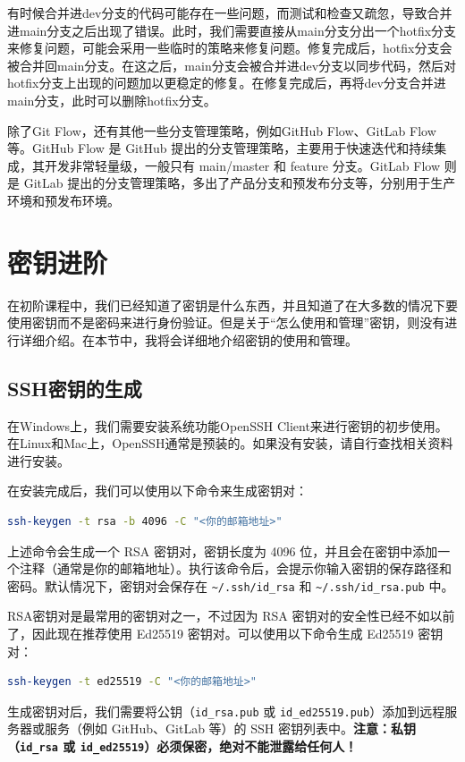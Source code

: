 \documentclass[../main.tex]{subfiles}
\begin{document}
有时候合并进dev分支的代码可能存在一些问题，而测试和检查又疏忽，导致合并进main分支之后出现了错误。此时，我们需要直接从main分支分出一个hotfix分支来修复问题，可能会采用一些临时的策略来修复问题。修复完成后，hotfix分支会被合并回main分支。在这之后，main分支会被合并进dev分支以同步代码，然后对hotfix分支上出现的问题加以更稳定的修复。在修复完成后，再将dev分支合并进main分支，此时可以删除hotfix分支。

除了Git Flow，还有其他一些分支管理策略，例如GitHub Flow、GitLab Flow等。GitHub Flow 是 GitHub 提出的分支管理策略，主要用于快速迭代和持续集成，其开发非常轻量级，一般只有 main/master 和 feature 分支。GitLab Flow 则是 GitLab 提出的分支管理策略，多出了产品分支和预发布分支等，分别用于生产环境和预发布环境。

\section{密钥进阶}

在初阶课程中，我们已经知道了密钥是什么东西，并且知道了在大多数的情况下要使用密钥而不是密码来进行身份验证。但是关于“怎么使用和管理”密钥，则没有进行详细介绍。在本节中，我将会详细地介绍密钥的使用和管理。

\subsection{SSH密钥的生成}

在Windows上，我们需要安装系统功能OpenSSH Client来进行密钥的初步使用。在Linux和Mac上，OpenSSH通常是预装的。如果没有安装，请自行查找相关资料进行安装。

在安装完成后，我们可以使用以下命令来生成密钥对：
\begin{lstlisting}[language=bash]
ssh-keygen -t rsa -b 4096 -C "<你的邮箱地址>"
\end{lstlisting}

上述命令会生成一个 RSA 密钥对，密钥长度为 4096 位，并且会在密钥中添加一个注释（通常是你的邮箱地址）。执行该命令后，会提示你输入密钥的保存路径和密码。默认情况下，密钥对会保存在 \texttt{\textasciitilde/.ssh/id\_rsa} 和 \texttt{\textasciitilde/.ssh/id\_rsa.pub} 中。

RSA密钥对是最常用的密钥对之一，不过因为 RSA 密钥对的安全性已经不如以前了，因此现在推荐使用 Ed25519 密钥对。可以使用以下命令生成 Ed25519 密钥对：
\begin{lstlisting}[language=bash]
ssh-keygen -t ed25519 -C "<你的邮箱地址>"
\end{lstlisting}

生成密钥对后，我们需要将公钥（\texttt{id\_rsa.pub} 或 \texttt{id\_ed25519.pub}）添加到远程服务器或服务（例如 GitHub、GitLab 等）的 SSH 密钥列表中。\textbf{注意：私钥（\texttt{id\_rsa} 或 \texttt{id\_ed25519}）必须保密，绝对不能泄露给任何人！}
\end{document}
